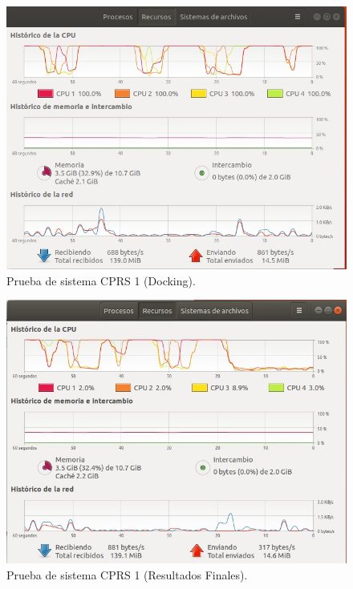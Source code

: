 \begin{figure}[H]
    \centering
    \includegraphics[scale=0.60]{Capitulo4/Documentos/Casos_de_sistema/imagenes_casos/DockingErik.jpeg}
    \caption{Prueba de sistema CPRS 1 (Docking).}
    \label{Evidencia2_1-3}
\end{figure}

\begin{figure}[H]
    \centering
    \includegraphics[scale=0.60]{Capitulo4/Documentos/Casos_de_sistema/imagenes_casos/ResultadosFinalesErik.jpeg}
    \caption{Prueba de sistema CPRS 1 (Resultados Finales).}
    \label{Evidencia2_1-4}
\end{figure}

